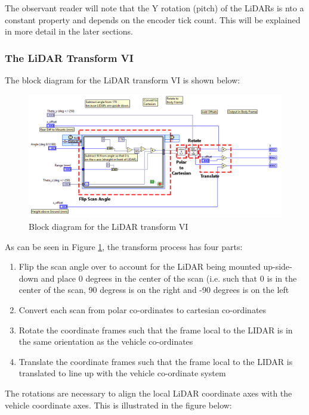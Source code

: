 \noindent The observant reader will note that the Y rotation (pitch) of the LiDARs is nto a constant property and depends on the encoder tick count. This will be explained in more detail in the later sections. 

\subsubsection{The LiDAR Transform VI}

The block diagram for the LiDAR transform VI is shown below:
\begin{figure}[h!]
\centering
\includegraphics[scale=0.5]{Photos/transformvi.png}
\caption{Block diagram for the LiDAR transform VI}
\label{fig:transformvi}
\end{figure}

\noindent As can be seen in Figure \ref{fig:transformvi}, the transform process has four parts:

\begin{enumerate}
\item Flip the scan angle over to account for the LiDAR being mounted up-side-down and place 0 degrees in the center of the scan (i.e. such that 0 is in the center of the scan, 90 degress is on the right and -90 degrees is on the left 
\item Convert each scan from polar co-ordinates to cartesian co-ordinates
\item Rotate the coordinate frames such that the frame local to the LIDAR is in the same orientation as the vehicle co-ordinates
\item Translate the coordinate frames such that the frame local to the LIDAR is translated to line up with the vehicle co-ordinate system
\end{enumerate}

\noindent The rotations are necessary to align the local LiDAR coordinate axes with the vehicle coordinate axes. This is illustrated in the figure below:

